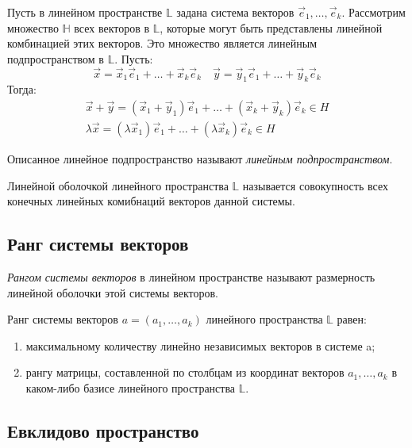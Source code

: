 Пусть в линейном пространстве $\mathbb{L}$ задана система векторов $\vec{e}_1, \ldots, \vec{e}_k$. Рассмотрим множество $\mathbb{H}$ всех векторов в $\mathbb{L}$, которые могут быть представлены линейной комбинацией этих векторов. Это множество является линейным подпространством в $\mathbb{L}$.
Пусть: \[
  \vec{x} = \vec{x}_1 \vec{e}_1 + \ldots + \vec{x}_k \vec{e}_k \quad \vec{y} = \vec{y}_1 \vec{e}_1 + \ldots + \vec{y}_k \vec{e}_k
\] 
Тогда:
\begin{gather*}
  \vec{x} + \vec{y} = \left(\vec{x}_1 + \vec{y}_1\right) \vec{e}_1 + \ldots + \left( \vec{x}_k + \vec{y}_k \right) \vec{e}_k \in H \\
  \lambda \vec{x} = \left( \lambda \vec{x}_1 \right) \vec{e}_1 + \ldots + \left( \lambda \vec{x}_k \right) \vec{e}_k \in H
\end{gather*}

Описанное линейное подпространство называют \textit{линейным подпространством}. 

\begin{definition}
  Линейной оболочкой линейного пространства $\mathbb{L}$ называется совокупность всех конечных линейных комибнаций векторов данной системы.
\end{definition}

\subsection{Ранг системы векторов}

\begin{definition}
  \textit{Рангом системы векторов} в линейном пространстве называют размерность линейной оболочки этой системы векторов.
\end{definition}

\begin{theorem}
  Ранг системы векторов $a = (a_1, \ldots, a_k)$ линейного пространства $\mathbb{L}$ равен:
  \begin{enumerate}
    \item максимальному количеству линейно независимых векторов в системе a;
    \item рангу матрицы, составленной по столбцам из координат векторов $a_1,\ldots, a_k$ в каком-либо базисе линейного пространства $\mathbb{L}$.
  \end{enumerate}
\end{theorem}

\subsection{Евклидово пространство}

